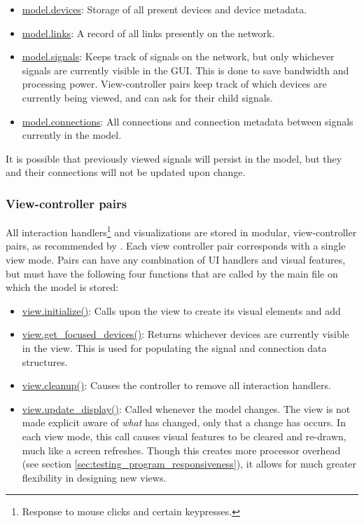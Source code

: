 \begin{itemize}
 	\item \url{model.devices}: Storage of all present devices and device metadata.
 	\item \url{model.links}: A record of all links presently on the network.
 	\item \url{model.signals}: Keeps track of signals on the network, but only whichever signals are currently visible in the GUI. This is done to save bandwidth and processing power. View-controller pairs keep track of which devices are currently being viewed, and can ask for their child signals. 
 	\item \url{model.connections}: All connections and connection metadata between signals currently in the model.
 \end{itemize} 

It is possible that previously viewed signals will persist in the model, but they and their connections will not be updated upon change.

		\subsubsection{View-controller pairs}

All interaction handlers\footnote{Response to mouse clicks and certain keypresses.} and visualizations are stored in modular, view-controller pairs, as recommended by . Each view controller pair corresponds with a single view mode. Pairs can have any combination of UI handlers and visual features, but must have the following four functions that are called by the main file on which the model is stored:

\begin{itemize}
	\item \url{view.initialize()}: Calls upon the view to create its visual elements and add 
	\item \url{view.get_focused_devices()}: Returns whichever devices are currently visible in the view. This is used for populating the signal and connection data structures.
	\item \url{view.cleanup()}: Causes the controller to remove all interaction handlers.
	\item \url{view.update_display()}: Called whenever the model changes. The view is not made explicit aware of \emph{what} has changed, only that a change has occurs. In each view mode, this call causes visual features to be cleared and re-drawn, much like a screen refreshes. Though this creates more processor overhead (see section \ref{sec:testing_program_responsiveness}), it allows for much greater flexibility in designing new views.
\end{itemize}

